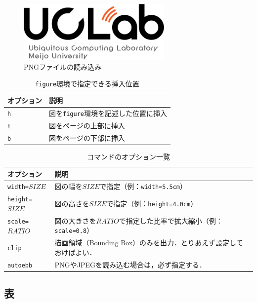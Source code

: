 \documentclass[a4j,11pt]{ujreport}
\begin{document}
\begin{figure}[ht]
	\centering
	\includegraphics[autoebb,clip,height=3.0cm]{fig/logo.png}
	\caption{PNGファイルの読み込み}
	\label{fig:ExamplePNG}
\end{figure}

\begin{table}[ht]
	\centering
	\caption{\texttt{figure}環境で指定できる挿入位置}
	\label{tab:FigureOptions}
	\small
	\begin{tabular}{l|l}
		\Hline 
		オプション & 説明 \\ 
		\hline\hline
		\texttt{h} & 図を\texttt{figure}環境を記述した位置に挿入\\
		\texttt{t} & 図をページの上部に挿入\\
		\texttt{b} & 図をページの下部に挿入\\
		\hline 
	\end{tabular} 
\end{table}

\begin{table}[ht]
	\centering
	\caption{コマンドのオプション一覧}
	\label{tab:IncludegraphicsOptions}
	\small
	\begin{tabular}{l|l}
		\Hline 
		オプション & 説明 \\ 
		\hline\hline
		\texttt{width=}$SIZE$ & 図の幅を$SIZE$で指定（例：\texttt{width=5.5cm}）\\
		\texttt{height=}$SIZE$ & 図の高さを$SIZE$で指定（例：\texttt{height=4.0cm}）\\
		\texttt{scale=}$RATIO$ & 図の大きさを$RATIO$で指定した比率で拡大縮小（例：\texttt{scale=0.8}）\\
		\texttt{clip} & 描画領域（Bounding Box）のみを出力．とりあえず設定しておけばよい．\\
		\texttt{autoebb} & PNGやJPEGを読み込む場合は，必ず指定する．\\
		\hline 
	\end{tabular} 
\end{table}

\subsection{表}
\end{document}
